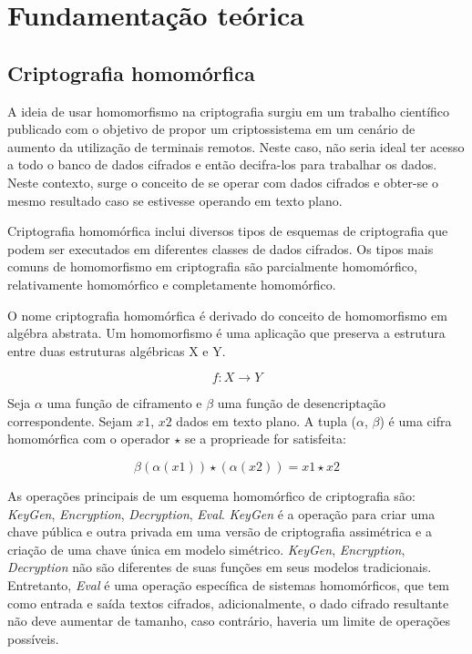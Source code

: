 \documentclass{ufsctex/ufsctex}
\begin{document}
\chapter{Fundamentação teórica}

\section{Criptografia homomórfica}

A ideia de usar homomorfismo na criptografia surgiu em um trabalho científico
publicado com o objetivo de propor um criptossistema em um cenário de aumento da utilização
de terminais remotos. Neste caso, não seria ideal ter acesso a todo o banco de dados
cifrados e então decifra-los para trabalhar os dados. Neste contexto, surge o conceito
de se operar com dados cifrados e obter-se o mesmo resultado caso se estivesse operando em
texto plano.\cite{homomorphic}

Criptografia homomórfica inclui diversos tipos de esquemas de criptografia que podem
ser executados em diferentes classes de dados cifrados. Os tipos mais comuns de homomorfismo
em criptografia são parcialmente homomórfico, relativamente homomórfico e completamente
homomórfico.
\cite{survey-homo}

O nome criptografia homomórfica é derivado do conceito de homomorfismo em
algébra abstrata. Um homomorfismo é uma aplicação que preserva a estrutura
entre duas estruturas algébricas X e Y.

\begin{equation}
{f} : X \longrightarrow Y
\end{equation}

Seja $\alpha$ uma função de ciframento e $\beta$ uma função de desencriptação
correspondente. Sejam $x1$, $x2$ dados em texto plano. A tupla ($\alpha$, $\beta$)
é uma cifra homomórfica com o operador $\star$ se a proprieade for satisfeita:

\begin{equation}
\beta (\alpha(x1)) \star (\alpha(x2)) = x1 \star x2
\end{equation}

As operações principais de um esquema homomórfico de criptografia são: \textit{KeyGen},
\textit{Encryption}, \textit{Decryption}, \textit{Eval}. \textit{KeyGen} é a operação
para criar uma chave pública e outra privada em uma versão de criptografia assimétrica
e a criação de uma chave única em modelo simétrico. \textit{KeyGen}, \textit{Encryption},
\textit{Decryption} não são diferentes de suas funções em seus modelos tradicionais. 
Entretanto, \textit{Eval} é uma operação específica de sistemas homomórficos, que tem
como entrada e saída textos cifrados, adicionalmente, o dado cifrado resultante não deve
aumentar de tamanho, caso contrário, haveria um limite de operações possíveis. \cite{survey-homo}
\end{document}
